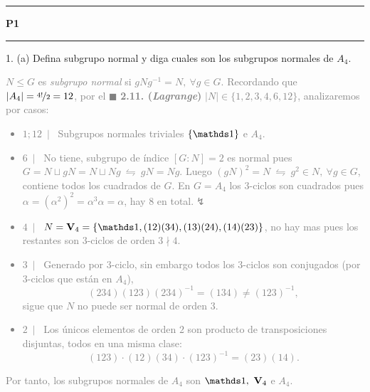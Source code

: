 \newcommand{\F}{\mathbb{F}}
\newcommand{\C}{\mathbb{C}}
\newcommand{\an}{\mathscr{A}} 
\newcommand{\Q}{\mathbb{Q}}
\renewcommand{\hom}{\operatorname{Hom}}
\newcommand{\ehom}{\operatorname{End}}

\-\vspace{-0.3cm}
  {\hrule \vspace{-0.15cm}
  \centering \textbf{P1} \vspace{0.1cm}
  \hrule}

    \newcommand{\Z}{\mathbb{Z}}
\vspace{0.2cm}
1. (a) Defina subgrupo normal y diga cuales son los subgrupos normales de \(A_4\). 

\textcolor{gray}{
  \(N\leq G\) es \emph{subgrupo normal} si \(gNg^{-1} = N, \ \forall g \in G\). Recordando que \(|A_4| = \nicefrac{4!}{2} = 12\), por el \(\blacksquare\) \textbf{2.11. (\emph{Lagrange})} \(|N| \in \{1, 2, 3, 4, 6, 12\}\), analizaremos por casos:  
  \begin{itemize}[left = 0cm]
    \item \( 1 ;12 \ \mid \  \) Subgrupos normales triviales \(\{\id\} \) e \(A_4\).
    \item \(6\ \mid \ \) No tiene, subgrupo de índice \([G:N] = 2\) es normal pues \( G  = N \sqcup gN = N \sqcup Ng \ \leftrightharpoons \ gN = Ng\). Luego \((gN)^2 = N \ \leftrightharpoons \ g^2 \in N, \ \forall g \in G\), contiene todos los cuadrados de \(G\). En \(G = A_4\) los \(3\)-ciclos son cuadrados pues \(\alpha = (\alpha^2)^2 = \alpha^3 \alpha = \alpha\), hay \(8\) en total.\(\lightning\)  
    \item \(4 \ \mid \ \) \(N = \textbf{V}_4 = \{\id, (12) (34), (13) (24), (1 4)(23)\}\), no hay mas pues los restantes son \(3\)-ciclos de orden \(3 \nmid 4\).     
    \item \(3 \ \mid \ \) Generado por \(3\)-ciclo, sin embargo todos los \(3\)-ciclos son conjugados (por \(3\)-ciclos que están en \(A_4\)), 
    \[ (234)(123)(234)^{-1} = (134) \neq (123)^{-1},\]
    sigue que \(N \) no puede ser normal de orden \(3\). 
    \item \(2 \ \mid \ \) Los únicos elementos de orden \(2\) son producto de transposiciones disjuntas, todos en una misma clase:
    \[(123)\cdot(12)(34)\cdot (123)^{-1} = (23)(14).\] 
  \end{itemize}
    \vspace{-0.3cm}
  Por tanto, los subgrupos normales de \(A_4\) son \(\id, \ \textbf{V}_4\) e \(A_4\). 
}

